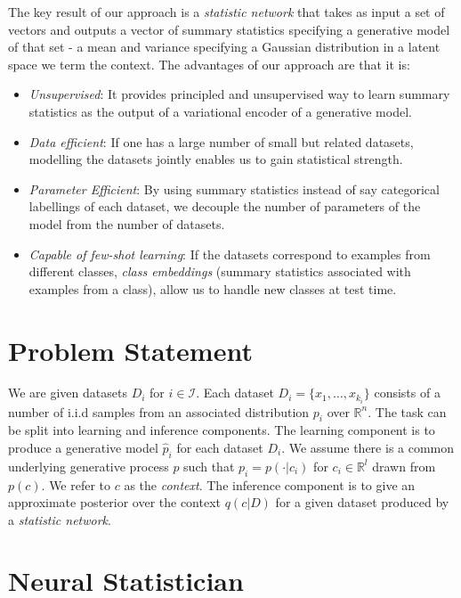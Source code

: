 \documentclass{article} \usepackage{iclr2017_conference,times}
\newcommand{\iid}{i.i.d }
\begin{document}
The key result of our approach is a \emph{statistic network} that takes as input a set of vectors and outputs a vector of summary statistics specifying a generative model of that set - a mean and variance specifying a Gaussian distribution in a latent space we term the context. The advantages of our approach are that it is:
\begin{itemize}
\item \emph{Unsupervised}: It provides principled and unsupervised way to learn summary statistics as the output of a variational encoder of a generative model.
\item \emph{Data efficient}: If one has a large number of small but related datasets, modelling the datasets jointly enables us to gain statistical strength.
\item \emph{Parameter Efficient}: By using summary statistics instead of say categorical labellings of each dataset, we decouple the number of parameters of the model from the number of datasets.
\item \emph{Capable of few-shot learning}: If the datasets correspond to examples from different classes, \emph{class embeddings} (summary statistics associated with examples from a class), allow us to handle new classes at test time.
\end{itemize}


\section{Problem Statement}
\vspace{-0.5em}
We are given datasets $D_i$ for $i \in \mathcal{I}$. Each dataset $D_i = \{x_1, \dots, x_{k_i} \}$ consists of a number of \iid samples from an associated distribution $p_i$ over $\mathbb{R}^n$. The task can be split into learning and inference components. The learning component is to produce a generative model $\hat{p}_i$ for each dataset $D_i$. We assume there is a common underlying generative process $p$ such that $p_i = p(\cdot | c_i)$ for $c_i \in \mathbb{R}^l$ drawn from $p(c)$. We refer to $c$ as the \emph{context}. The inference component is to give an approximate posterior over the context $q(c| D)$ for a given dataset produced by a \emph{statistic network}.

\vspace{-0.5em}
\section{Neural Statistician}
\end{document}
